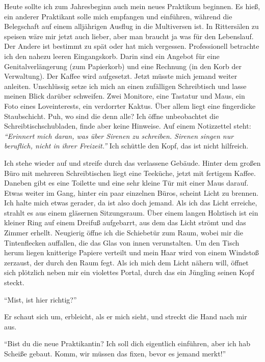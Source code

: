 \documentclass[final]{multiversum}
\begin{document}
Heute sollte ich zum Jahresbeginn auch mein neues Praktikum beginnen.
Es hieß, ein anderer Praktikant solle mich empfangen und einführen, während die Belegschaft auf einem alljährigen Ausflug in die Multiversen ist.
In Rittersälen zu speisen wäre mir jetzt auch lieber, aber man braucht ja was für den Lebenslauf.
Der Andere ist bestimmt zu spät oder hat mich vergessen.
Professionell betrachte ich den nahezu leeren Eingangskorb.
Darin sind ein Angebot für eine Genitalverlängerung (zum Papierkorb) und eine Rechnung (in den Korb der Verwaltung).
Der Kaffee wird aufgesetzt.
Jetzt müsste mich jemand weiter anleiten.
Unschlüssig setze ich mich an einen zufälligen Schreibtisch und lasse meinen Blick darüber schweifen.
Zwei Monitore, eine Tastatur und Maus, ein Foto eines Loveinterests, ein verdorrter Kaktus.
Über allem liegt eine fingerdicke Staubschicht.
Puh, wo sind die denn alle?
Ich öffne unbeobachtet die Schreibtischschubladen, finde aber keine Hinweise.
Auf einem Notizzettel steht:
\textit{\enquote{Erinnert mich daran, was über Sirenen zu schreiben. Sirenen singen nur beruflich, nicht in ihrer Freizeit.}}
Ich schüttle den Kopf, das ist nicht hilfreich.

Ich stehe wieder auf und streife durch das verlassene Gebäude.
Hinter dem großen Büro mit mehreren Schreibtischen liegt eine Teeküche, jetzt mit fertigem Kaffee.
Daneben gibt es eine Toilette und eine sehr kleine Tür mit einer Maus darauf.
Etwas weiter im Gang, hinter ein paar einzelnen Büros, scheint Licht zu brennen.
Ich halte mich etwas gerader, da ist also doch jemand.
Als ich das Licht erreiche, strahlt es aus einem gläsernen Sitzungsraum.
Über einem langen Holztisch ist ein kleiner Ring auf einem Dreifuß aufgebarrt, aus dem das Licht strömt und das Zimmer erhellt.
Neugierig öffne ich die Schiebetür zum Raum, wobei mir die Tintenflecken auffallen, die das Glas von innen verunstalten.
Um den Tisch herum liegen knitterige Papiere verteilt und mein Haar wird von einem Windstoß zerzaust, der durch den Raum fegt.
Als ich mich dem Licht nähern will, öffnet sich plötzlich neben mir ein violettes Portal, durch das ein Jüngling seinen Kopf steckt.

\enquote{Mist, ist hier richtig?}

Er schaut sich um, erbleicht, als er mich sieht, und streckt die Hand nach mir aus.

\enquote{Bist du die neue Praktikantin? Ich soll dich eigentlich einführen, aber ich hab Scheiße gebaut. 
Komm, wir müssen das fixen, bevor es jemand merkt!}
\end{document}
